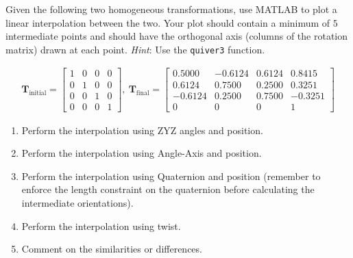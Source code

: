 \documentclass[12pt]{article}
\newenvironment{problem}[2][Problem]{\begin{trivlist}
\item[\hskip \labelsep {\bfseries #1}\hskip \labelsep {\bfseries #2.}]}{\end{trivlist}}
\begin{document}
\begin{problem}{4}%
Given the following two homogeneous transformations, use MATLAB to plot a linear
interpolation between the two. Your plot should contain a minimum of $5$ intermediate points and should have the orthogonal axis (columns of the rotation matrix) drawn at each point. \textit{Hint}: Use the \verb|quiver3| function.

\begin{align*}\boldsymbol{T}_{\textrm{initial}} = \begin{bmatrix}
        1 & 0 & 0 & 0 \\
        0 & 1 & 0 & 0 \\
        0 & 0 & 1 & 0\\
        0 & 0 & 0 & 1
        \end{bmatrix},~\boldsymbol{T}_{\textrm{final}} = \begin{bmatrix}
        0.5000 & -0.6124 & 0.6124 & 0.8415 \\
        0.6124 & 0.7500 & 0.2500 & 0.3251 \\
        -0.6124 & 0.2500 & 0.7500 & -0.3251\\
        0 & 0 & 0 & 1
        \end{bmatrix}
\end{align*}

\begin{enumerate}[label=(\alph*)]
    \item Perform the interpolation using ZYZ angles and position.
    \item Perform the interpolation using Angle-Axis and position.
    \item Perform the interpolation using Quaternion and position (remember to enforce the length constraint on the quaternion before calculating the intermediate orientations).
    \item Perform the interpolation using twist.
    \item Comment on the similarities or differences.
\end{enumerate}

\end{problem}
\end{document}
